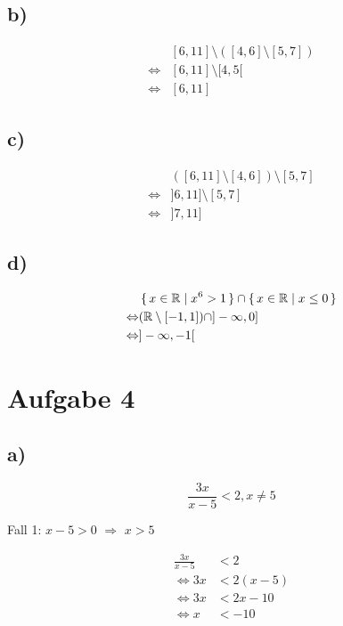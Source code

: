 \documentclass[a4paper, 11pt]{article}
\begin{document}
\subsection{b)}
\label{sec:org1041c24}
\begin{align*}
    & [6, 11] \setminus ([4, 6] \setminus [5, 7]) \\
    \Leftrightarrow & [6, 11] \setminus [4, 5[ \\
    \Leftrightarrow & [6, 11]
\end{align*}

\subsection{c)}
\label{sec:org28889b7}
\begin{align*}
    & ([6, 11] \setminus [4, 6]) \setminus [5, 7] \\
    \Leftrightarrow & ]6, 11] \setminus [5, 7] \\
    \Leftrightarrow & ]7, 11]
\end{align*}

\subsection{d)}
\label{sec:org1805737}
\begin{align*}
    & \set{x \in \mathbb{R} | x^6 > 1} \cap \set{x \in \mathbb{R} | x \leq 0} \\
    \Leftrightarrow & (\mathbb{R} \setminus [-1, 1]) \cap ]-\infty, 0] \\
    \Leftrightarrow & ]-\infty, -1[
\end{align*}

\section{Aufgabe 4}
\label{sec:org01966d7}
\subsection{a)}
\label{sec:org06a9b21}
$$ \frac{3x}{x-5} < 2, x \neq 5 $$

Fall 1: \(x - 5 > 0\) \(\Rightarrow\) \(x > 5\)

\begin{align*}
    \frac{3x}{x-5} &< 2 \\
    \Leftrightarrow 3x &< 2(x-5) \\
    \Leftrightarrow 3x &< 2x-10 \\
    \Leftrightarrow x &< -10
\end{align*}
\end{document}
